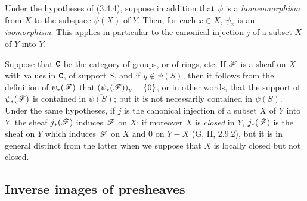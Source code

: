 \begin{env}[3.4.5]
\label{0.3.4.5}
Under the hypotheses of \hyperref[0.3.4.4]{(3.4.4)}, suppose in addition that $\psi$ is a
{\em homeomorphism} from $X$ to the subspace $\psi(X)$ of $Y$. Then, for each
$x\in X$, $\psi_x$ is an {\em isomorphism}. This applies in particular to the
canonical injection $j$ of a subset $X$ of $Y$ into $Y$.
\end{env}

\begin{env}[3.4.6]
\label{0.3.4.6}
Suppose that $\mathtt{C}$ be the category of groups, or of rings, etc. If $\mathscr{F}$ is a
sheaf on $X$ with values in $\mathtt{C}$, of support $S$, and if
$y\not\in\overline{\psi(S)}$, then it follows from the definition of
$\psi_*(\mathscr{F})$ that $(\psi_*(\mathscr{F}))_y=\{0\}$, or in other words, that the
support of $\psi_*(\mathscr{F})$ is contained in $\overline{\psi(S)}$; but it is not
necessarily contained in $\psi(S)$. Under the same hypotheses, if $j$ is the
canonical injection of a subset $X$ of $Y$ into $Y$, the sheaf $j_*(\mathscr{F})$
induces $\mathscr{F}$ on $X$; if moreover $X$ is {\em closed} in $Y$, $j_*(\mathscr{F})$
is the sheaf on $Y$ which induces $\mathscr{F}$ on $X$ and $0$ on $Y-X$
(G, II, 2.9.2), but it is in general distinct from the latter when we suppose
that $X$ is locally closed but not closed.
\end{env}

\subsection{Inverse images of presheaves}
\label{subsection-inverse-images-of-presheaves}

